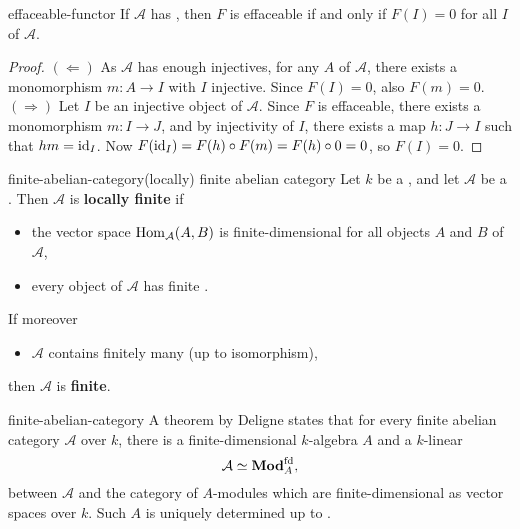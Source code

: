 \begin{example}{effaceable-functor}
    If $\mathcal{A}$ has , then $F$ is effaceable if and only if $F(I) = 0$ for all  $I$ of $\mathcal{A}$.
    \begin{proof}
        $(\Leftarrow)$ As $\mathcal{A}$ has enough injectives, for any $A$ of $\mathcal{A}$, there exists a monomorphism $m \colon A \to I$ with $I$ injective. Since $F(I) = 0$, also $F(m) = 0$.
        $(\Rightarrow)$ Let $I$ be an injective object of $\mathcal{A}$. Since $F$ is effaceable, there exists a monomorphism $m \colon I \to J$, and by injectivity of $I$, there exists a map $h \colon J \to I$ such that $hm = \textup{id}_I$. Now $F(\textup{id}_I) = F(h) \circ F(m) = F(h) \circ 0 = 0$, so $F(I) = 0$.
    \end{proof}
\end{example}

\begin{topic}{finite-abelian-category}{(locally) finite abelian category}
    Let $k$ be a , and let $\mathcal{A}$ be a . Then $\mathcal{A}$ is \textbf{locally finite} if
    \begin{itemize}
        \item the vector space $\operatorname{Hom}_\mathcal{A}(A, B)$ is finite-dimensional for all objects $A$ and $B$ of $\mathcal{A}$,
        \item every object of $\mathcal{A}$ has finite .
    \end{itemize}
    If moreover
    \begin{itemize}
        \item $\mathcal{A}$ contains finitely many  (up to isomorphism),
    \end{itemize}
    then $\mathcal{A}$ is \textbf{finite}.
\end{topic}

\begin{example}{finite-abelian-category}
    A theorem by Deligne states that for every finite abelian category $\mathcal{A}$ over $k$, there is a finite-dimensional $k$-algebra $A$ and a $k$-linear 
    \[ \mathcal{A} \simeq \textbf{Mod}_A^\textup{fd} , \]
    between $\mathcal{A}$ and the category of $A$-modules which are finite-dimensional as vector spaces over $k$. Such $A$ is uniquely determined up to .
\end{example}

